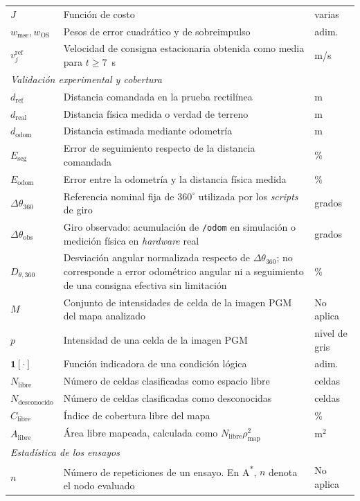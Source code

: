 \begin{appendices}
{\begin{longtable}{p{2.7cm} p{8.5cm} p{2.2cm}}
$J$ & Función de costo & varias \\
$w_{\mathrm{mse}},w_{\mathrm{OS}}$ & Pesos de error cuadrático y de sobreimpulso & adim. \\
$v_j^{\mathrm{ref}}$ & Velocidad de consigna estacionaria obtenida como media para $t\geq7$~s & m/s \\
\multicolumn{3}{l}{\textit{Validación experimental y cobertura}}\\
$d_{\mathrm{ref}}$ & Distancia comandada en la prueba rectilínea & m \\
$d_{\mathrm{real}}$ & Distancia física medida o verdad de terreno & m \\
$d_{\mathrm{odom}}$ & Distancia estimada mediante odometría & m \\
$E_{\mathrm{seg}}$ & Error de seguimiento respecto de la distancia
comandada & \% \\
$E_{\mathrm{odom}}$ & Error entre la odometría y la distancia física
medida & \% \\
$\Delta\theta_{360}$ & Referencia nominal fija de $360^\circ$ utilizada por los \textit{scripts} de giro & grados \\
$\Delta\theta_{\mathrm{obs}}$ & Giro observado: acumulación de \texttt{/odom} en simulación o medición física en \textit{hardware} real & grados \\
$D_{\theta,360}$ & Desviación angular normalizada respecto de $\Delta\theta_{360}$; no corresponde a error odométrico angular ni a seguimiento de una consigna efectiva sin limitación & \% \\
$M$ & Conjunto de intensidades de celda de la imagen PGM del mapa analizado & No aplica \\
$p$ & Intensidad de una celda de la imagen PGM & nivel de gris \\
$\mathbf{1}[\cdot]$ & Función indicadora de una condición lógica & adim. \\
$N_{\mathrm{libre}}$ & Número de celdas clasificadas como espacio libre & celdas \\
$N_{\mathrm{desconocido}}$ & Número de celdas clasificadas como
desconocidas & celdas \\
$C_{\mathrm{libre}}$ & Índice de cobertura libre del mapa & \% \\
$A_{\mathrm{libre}}$ & Área libre mapeada, calculada como $N_{\mathrm{libre}}\rho_{\mathrm{map}}^2$ & m$^2$ \\
\multicolumn{3}{l}{\textit{Estadística de los ensayos}}\\
$n$ & Número de repeticiones de un ensayo. En A\textsuperscript{*}, $n$ denota el nodo evaluado & No aplica \\

\end{longtable}}
\end{appendices}
